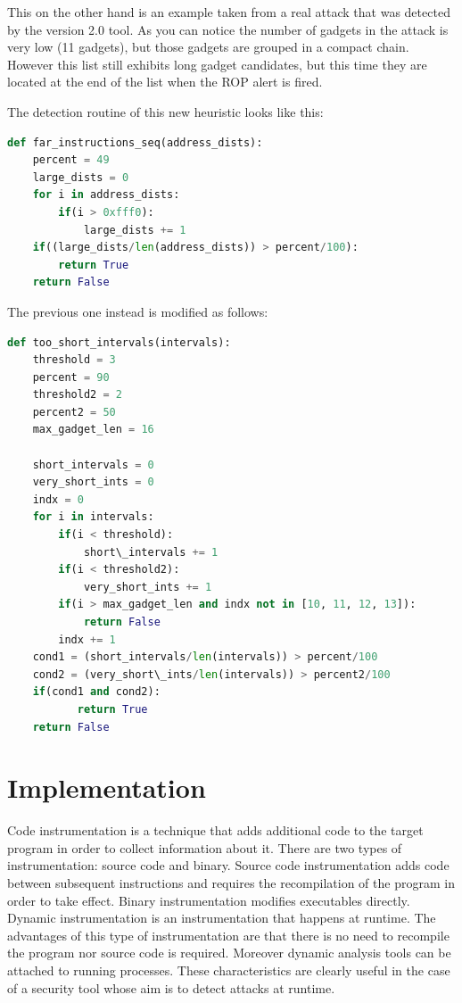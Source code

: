 \documentclass[Lau,binding=0.6cm]{sapthesis}
\begin{document}
This on the other hand is an example taken from a real attack that was detected by the version 2.0 tool. As you can notice the number of gadgets in the attack is very low (11 gadgets), but those gadgets are grouped in a compact chain. However this list still exhibits long gadget candidates, but this time they are located at the end of the list when the ROP alert is fired.


The detection routine of this new heuristic looks like this:

\begin{lstlisting}[language=Python]
def far_instructions_seq(address_dists):
    percent = 49
    large_dists = 0
    for i in address_dists:
        if(i > 0xfff0):
            large_dists += 1
    if((large_dists/len(address_dists)) > percent/100):
        return True
    return False
\end{lstlisting}

The previous one instead is modified as follows:

\begin{lstlisting}[language=Python]
def too_short_intervals(intervals):
    threshold = 3        
    percent = 90
    threshold2 = 2
    percent2 = 50
    max_gadget_len = 16

    short_intervals = 0
    very_short_ints = 0
    indx = 0
    for i in intervals:
        if(i < threshold):
            short\_intervals += 1
        if(i < threshold2):
            very_short_ints += 1
        if(i > max_gadget_len and indx not in [10, 11, 12, 13]):
            return False
        indx += 1
    cond1 = (short_intervals/len(intervals)) > percent/100
    cond2 = (very_short\_ints/len(intervals)) > percent2/100
    if(cond1 and cond2):
           return True
    return False
\end{lstlisting}

\chapter{Implementation}

Code instrumentation is a technique that adds additional code to the target program in order to collect information about it. There are two types of instrumentation: source code and binary.
Source code instrumentation adds code between subsequent instructions and requires the recompilation of the program in order to take effect. Binary instrumentation modifies executables directly.
Dynamic instrumentation is an instrumentation that happens at runtime. The advantages of this type of instrumentation are that there is no need to recompile the program nor source code is required. Moreover dynamic analysis tools can be attached to running processes. These characteristics are clearly useful in the case of a security tool whose aim is to detect attacks at runtime.
\end{document}
